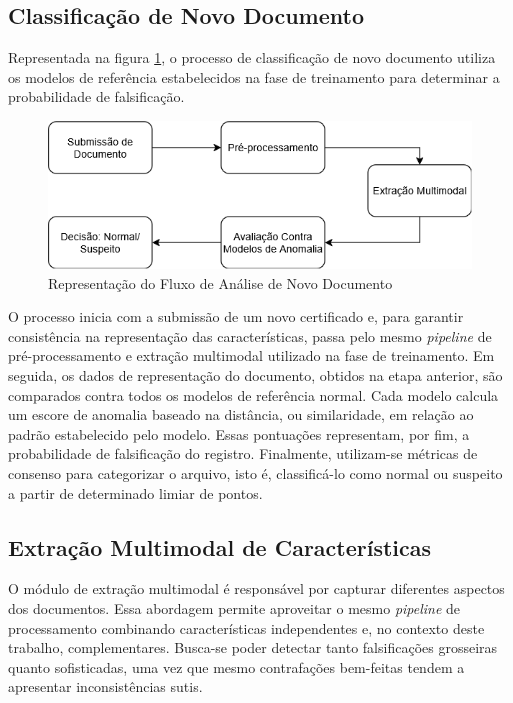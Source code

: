 \subsection{Classificação de Novo Documento}

Representada na figura \ref{fig:fluxoanalise}, o processo de classificação de novo documento utiliza os modelos de referência estabelecidos na fase de treinamento para determinar a probabilidade de falsificação.

\begin{figure}[H]
	\caption{\label{fig:fluxoanalise}Representação do Fluxo de Análise de Novo Documento}
    \begin{center}
    \includegraphics[width=1\linewidth]{images/FluxoAnalise.png}
	\end{center}
\end{figure}

O processo inicia com a submissão de um novo certificado e, para garantir consistência na representação das características, passa pelo mesmo \textit{pipeline} de pré-processamento e extração multimodal utilizado na fase de treinamento. Em seguida, os dados de representação do documento, obtidos na etapa anterior, são comparados contra todos os modelos de referência normal. Cada modelo calcula um escore de anomalia baseado na distância, ou similaridade, em relação ao padrão estabelecido pelo modelo. Essas pontuações representam, por fim, a probabilidade de falsificação do registro. Finalmente, utilizam-se métricas de consenso para categorizar o arquivo, isto é, classificá-lo como normal ou suspeito a partir de determinado limiar de pontos.

\subsection{Extração Multimodal de Características}

O módulo de extração multimodal é responsável por capturar diferentes aspectos dos documentos. Essa abordagem permite aproveitar o mesmo \textit{pipeline} de processamento combinando características independentes e, no contexto deste trabalho, complementares. Busca-se poder detectar tanto falsificações grosseiras quanto sofisticadas, uma vez que mesmo contrafações bem-feitas tendem a apresentar inconsistências sutis.

